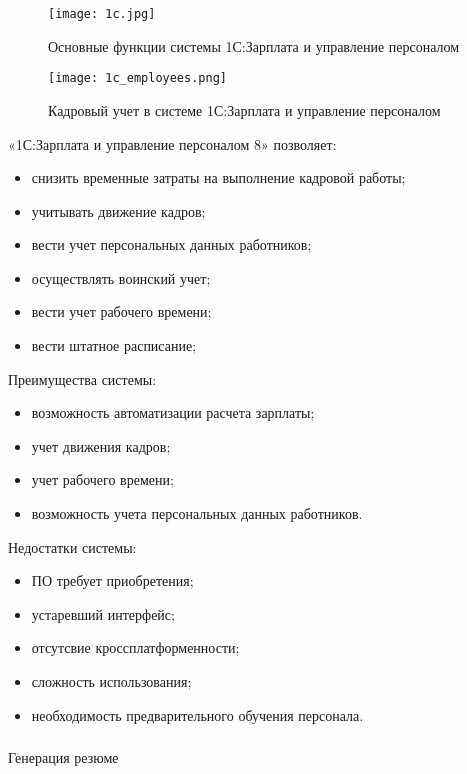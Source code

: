 \begin{figure}[!h]
	\centering
	\texttt{[image: 1c.jpg]} 
	\caption{Основные функции системы 1С:Зарплата и управление персоналом}
	\label{fig:analysis:analogues:1c}
\end{figure}

\begin{figure}[!h]
	\centering
	\texttt{[image: 1c\_employees.png]} 
	\caption{Кадровый учет в системе 1С:Зарплата и управление персоналом}
	\label{fig:analysis:analogues:1c_employees}
\end{figure}

«1С:Зарплата и управление персоналом 8» позволяет:
\begin{itemize}
	\item снизить временные затраты на выполнение кадровой работы;
	\item учитывать движение кадров;
	\item вести учет персональных данных работников;
	\item осуществлять воинский учет;
	\item вести учет рабочего времени;
	\item вести штатное расписание;
\end{itemize}

Преимущества системы:
\begin{itemize}
	\item возможность автоматизации расчета зарплаты;
	\item учет движения кадров;
	\item учет рабочего времени;
	\item возможность учета персональных данных работников.
\end{itemize}

Недостатки системы:
\begin{itemize}
	\item ПО требует приобретения;
	\item устаревший интерфейс;
	\item отсутсвие кроссплатформенности;
	\item сложность использования;
	\item необходимость предварительного обучения персонала.
\end{itemize}
\pagebreak

\subsubsection{} Генерация резюме
\label{sec:analysis:analogues:generation}


